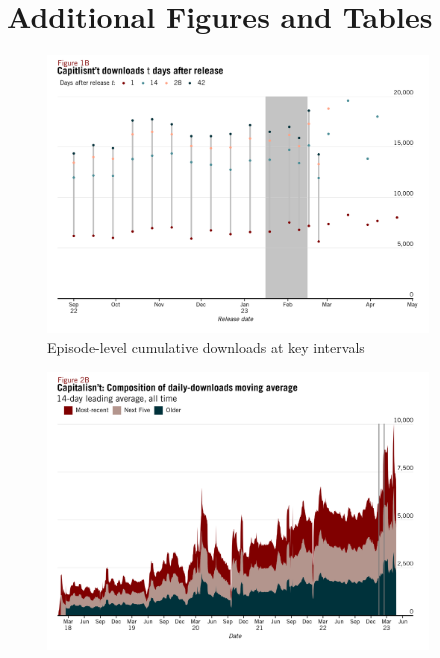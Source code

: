 \documentclass[11pt, letterpaper, twoside]{article}
\begin{document}
\newpage

\appendix
\renewcommand\thefigure{\thesection.\arabic{figure}}
\setcounter{figure}{0}
\setcounter{table}{0}
\section{Additional Figures and Tables}

\begin{figure}[!htbp]
  \centering
  \includegraphics[width = 0.9\textwidth]{figures/recent_20_1142842_day_cumul_perf.png}
  \caption{Episode-level cumulative downloads at key intervals}
  \label{appendix:recent_20_1142842_cumul_perf}
\end{figure}


\begin{figure}[!htbp]
  \centering
  \includegraphics[width=0.9\textwidth]{figures/alltime_podcast_moving_avg_decomp.png}
  \caption{}
  \label{appendix :alltime_moving_avg_perf_decomp}
\end{figure}
\end{document}
